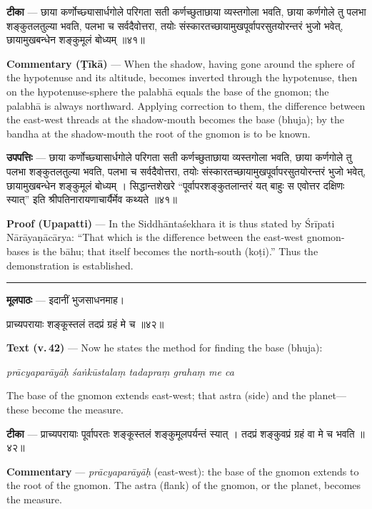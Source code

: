 \documentclass[11pt,a4paper]{article}
\newcommand{\dev}[1]{{\devanagarifont #1}}
\newcommand{\skt}[1]{{\devanagarifont\color{sktcolor} #1}}
\newenvironment{bilingual}{%
  \par\noindent
  \begin{minipage}[t]{0.47\textwidth}%
}{%
  \par\end{minipage}%
}
\newcommand{\rightcol}{%
  \par\end{minipage}%
  \hfill
  \begin{minipage}[t]{0.47\textwidth}%
}
\begin{document}
\medskip

\begin{bilingual}
\textbf{टीका} --- छाया कर्णोच्छ्यासार्धगोले परिगता सती कर्णच्छुताछाया व्यस्तगोला भवति, छाया कर्णगोले तु पलभा शङ्कुतलतुल्या भवति, पलभा च सर्वदैवोत्तरा, तयोः संस्कारतच्छायामुखपूर्वापरसुतयोरन्तरं भुजो भवेत्, छायामुखबन्धेन शङ्कुमूलं बोध्यम् ॥४१॥
\rightcol
\textbf{Commentary (Ṭīkā)} --- When the shadow, having gone around the sphere of the hypotenuse and its altitude, becomes inverted through the hypotenuse, then on the hypotenuse-sphere the palabhā equals the base of the gnomon; the palabhā is always northward. Applying correction to them, the difference between the east-west threads at the shadow-mouth becomes the base (bhuja); by the bandha at the shadow-mouth the root of the gnomon is to be known.
\end{bilingual}

\medskip

\begin{bilingual}
\textbf{उपपत्तिः} --- छाया कर्णोच्छ्यासार्धगोले परिगता सती कर्णच्छुताछाया व्यस्तगोला भवति, छाया कर्णगोले तु पलभा शङ्कुतलतुल्या भवति, पलभा च सर्वदैवोत्तरा, तयोः संस्कारतच्छायामुखपूर्वापरसुतयोरन्तरं भुजो भवेत्, छायामुखबन्धेन शङ्कुमूलं बोध्यम् । सिद्धान्तशेखरे ``पूर्वापरशङ्कुतलान्तरं यत् बाहुः स एवोत्तर दक्षिणः स्यात्'' इति श्रीपतिनारायणाचार्यैर्मेव कथ्यते ॥४१॥
\rightcol
\textbf{Proof (Upapatti)} --- In the Siddhāntaśekhara it is thus stated by Śrīpati Nārāyaṇācārya: ``That which is the difference between the east-west gnomon-bases is the bāhu; that itself becomes the north-south (koṭi).'' Thus the demonstration is established.
\end{bilingual}

\medskip
\noindent\rule{\textwidth}{0.4pt}

\begin{bilingual}
\textbf{मूलपाठः} --- इदानीं भुजसाधनमाह।

\dev{प्राच्यपरायाः शङ्कूस्तलं तदप्रं ग्रहं मे च} ॥४२॥
\rightcol
\textbf{Text (v.\,42)} --- Now he states the method for finding the base (bhuja):

\textit{prācyaparāyāḥ śaṅkūstalaṃ tadapraṃ grahaṃ me ca}

The base of the gnomon extends east-west; that astra (side) and the planet---these become the measure.
\end{bilingual}

\medskip

\begin{bilingual}
\textbf{टीका} --- \skt{प्राच्यपरायाः} पूर्वापरतः शङ्कूस्तलं शङ्कुमूलपर्यन्तं स्यात् । तदप्रं शङ्कुवप्रं ग्रहं वा मे च भवति ॥४२॥
\rightcol
\textbf{Commentary} --- \textit{prācyaparāyāḥ} (east-west): the base of the gnomon extends to the root of the gnomon. The astra (flank) of the gnomon, or the planet, becomes the measure.
\end{bilingual}
\end{document}
